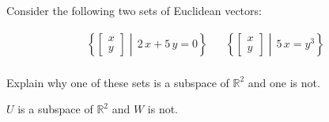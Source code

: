 
\begin{exerciseStatement}


Consider the following two sets of Euclidean vectors: 


\begin{align*}  \left\{ \left[\begin{array}{c}
x \\
y
\end{array}\right] \middle|\,2 \, x + 5 \, y = 0\right\}  & &   \left\{ \left[\begin{array}{c}
x \\
y
\end{array}\right] \middle|\,5 \, x = y^{3}\right\}  \\ \end{align*}
            

 Explain why one of these sets is a subspace of \(\mathbb{R}^ 2 \) and one is not. 


\end{exerciseStatement}
    
\begin{exerciseAnswer} 


\(U\) is a subspace of \(\mathbb{R}^ 2 \) and \(W\) is not.


\end{exerciseAnswer}
    
